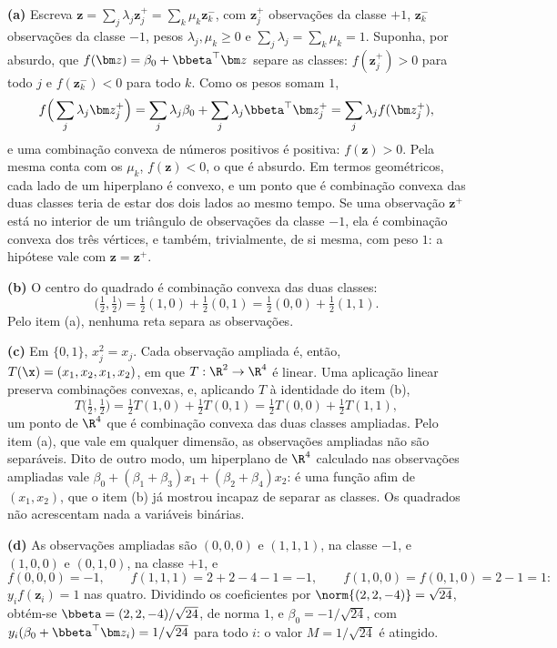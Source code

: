 \begin{solucao}
\textbf{(a)} Escreva $\bm z=\sum_j\lambda_j\bm z_j^+=\sum_k\mu_k\bm z_k^-$, com
$\bm z_j^+$ observações da classe $+1$, $\bm z_k^-$ observações da classe $-1$, pesos
$\lambda_j,\mu_k\ge0$ e $\sum_j\lambda_j=\sum_k\mu_k=1$. Suponha, por absurdo, que
$f(\bm z)=\beta_0+\bbeta^\top\bm z$ separe as classes: $f(\bm z_j^+)>0$ para todo $j$ e
$f(\bm z_k^-)<0$ para todo $k$. Como os pesos somam $1$,
\[
  f\Big(\sum_j\lambda_j\bm z_j^+\Big)=\sum_j\lambda_j\beta_0+\sum_j\lambda_j\bbeta^\top\bm z_j^+
  =\sum_j\lambda_jf(\bm z_j^+) ,
\]
e uma combinação convexa de números positivos é positiva: $f(\bm z)>0$. Pela mesma conta com
os $\mu_k$, $f(\bm z)<0$, o que é absurdo. Em termos geométricos, cada lado de um hiperplano é
convexo, e um ponto que é combinação convexa das duas classes teria de estar dos dois lados
ao mesmo tempo. Se uma observação $\bm z^+$ está no interior de um triângulo de observações
da classe $-1$, ela é combinação convexa dos três vértices, e também, trivialmente, de si
mesma, com peso $1$: a hipótese vale com $\bm z=\bm z^+$.

\smallskip
\textbf{(b)} O centro do quadrado é combinação convexa das duas classes:
\[
  \big(\tfrac12,\tfrac12\big)=\tfrac12(1,0)+\tfrac12(0,1)=\tfrac12(0,0)+\tfrac12(1,1) .
\]
Pelo item (a), nenhuma reta separa as observações.

\smallskip
\textbf{(c)} Em $\{0,1\}$, $x_j^2=x_j$. Cada observação ampliada é, então,
$T(\x)=(x_1,x_2,x_1,x_2)$, em que $T:\R^2\to\R^4$ é linear. Uma aplicação linear preserva
combinações convexas, e, aplicando $T$ à identidade do item (b),
\[
  T\big(\tfrac12,\tfrac12\big)=\tfrac12T(1,0)+\tfrac12T(0,1)=\tfrac12T(0,0)+\tfrac12T(1,1),
\]
um ponto de $\R^4$ que é combinação convexa das duas classes ampliadas. Pelo item (a), que vale
em qualquer dimensão, as observações ampliadas não são separáveis. Dito de outro modo, um
hiperplano de $\R^4$ calculado nas observações ampliadas vale
$\beta_0+(\beta_1+\beta_3)x_1+(\beta_2+\beta_4)x_2$: é uma função afim de $(x_1,x_2)$, que o
item (b) já mostrou incapaz de separar as classes. Os quadrados não acrescentam nada a
variáveis binárias.

\smallskip
\textbf{(d)} As observações ampliadas são $(0,0,0)$ e $(1,1,1)$, na classe $-1$, e
$(1,0,0)$ e $(0,1,0)$, na classe $+1$, e
\[
  f(0,0,0)=-1,\qquad f(1,1,1)=2+2-4-1=-1,\qquad f(1,0,0)=f(0,1,0)=2-1=1 :
\]
$y_if(\bm z_i)=1$ nas quatro. Dividindo os coeficientes por $\norm{(2,2,-4)}=\sqrt{24}$,
obtém-se $\bbeta=(2,2,-4)/\sqrt{24}$, de norma $1$, e $\beta_0=-1/\sqrt{24}$, com
$y_i(\beta_0+\bbeta^\top\bm z_i)=1/\sqrt{24}$ para todo $i$: o valor $M=1/\sqrt{24}$ é
atingido.


\end{solucao}
